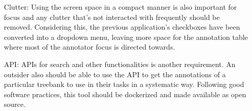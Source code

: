 \begin{itemize}[before=\normalfont, font=\itshape, align=left]
\item[Clutter:]
Using the screen space in a compact manner is also important for focus and any clutter that's not interacted with frequently should be removed.
Considering this, the previous application's checkboxes have been converted into a dropdown menu, leaving more space for the annotation table where most of the annotator focus is directed towards.

\item[API:]
APIs for search and other functionalities is another requirement.
An outsider also should be able to use the API to get the annotations of a particular treebank to use in their tasks in a systematic way.
Following good software practices, this tool should be dockerized and made available as open source.
\end{itemize}
